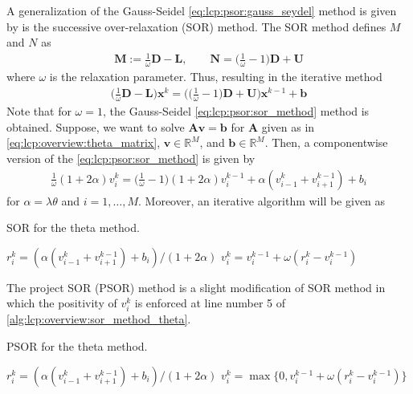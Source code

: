 A generalization of the Gauss-Seidel \eqref{eq:lcp:psor:gauss_seydel} method is given by is the successive over-relaxation (SOR) method. The SOR method defines $M$ and $N$ as 
\begin{align*}
  \mathbf{M} := \frac{1}{\omega}\mathbf{D} - \mathbf{L}, \qquad \mathbf{N}=\bigg(\frac{1}{\omega} -1\bigg)\mathbf{D} + \mathbf{U}
\end{align*}
where $\omega$ is the relaxation parameter. Thus, resulting in the iterative method
\begin{align}
  \label{eq:lcp:psor:sor_method}
  \bigg(\frac{1}{\omega}\mathbf{D} - \mathbf{L}\bigg)\mathbf{x}^{k} = \bigg(\bigg(\frac{1}{\omega}-1\bigg)\mathbf{D} + \mathbf{U}\bigg)\mathbf{x}^{k-1} + \mathbf{b}
\end{align}
Note that for $\omega=1$, the Gauss-Seidel \eqref{eq:lcp:psor:sor_method} method is obtained. Suppose, we want to solve $\mathbf{A}\mathbf{v}=\mathbf{b}$ for $\mathbf{A}$ given as in \eqref{eq:lcp:overview:theta_matrix}, $\mathbf{v}\in\mathbb{R}^{M}$, and $\mathbf{b}\in\mathbb{R}^{M}$. Then, a componentwise version of the \eqref{eq:lcp:psor:sor_method} is given by 
\begin{align}
  \label{eq:lcp:psor:sor_method_cwise}
  \frac{1}{\omega}(1+2\alpha)v^{k}_i = \bigg(\frac{1}{\omega}-1\bigg)(1+2\alpha)v^{k-1}_{i} + \alpha (v^{k}_{i-1} + v^{k-1}_{i+1}) + b_i
\end{align}
for $\alpha=\lambda\theta$ and $i=1,\dots,M$. Moreover, an iterative algorithm will be given as
\begin{algorithm}[H]
  \caption{SOR for the theta method.}\label{alg:lcp:overview:sor_method_theta}
  \begin{algorithmic}[1]
  \State $r^{k}_{i} = (\alpha(v^{k}_{i-1} + v^{k-1}_{i+1}) + b_i)/(1+2\alpha)$ 
  \State $v^{k}_{i} = v^{k-1}_i + \omega(r^{k}_{i} - v^{k-1}_i)$
  \EndFor
  \EndFor
\end{algorithmic}
\end{algorithm}
The project SOR (PSOR) method is a slight modification of SOR method in which the positivity of $v^{k}_i$ is enforced at line number 5 of \eqref{alg:lcp:overview:sor_method_theta}.
\begin{algorithm}[H]
  \caption{PSOR for the theta method.}\label{alg:lcp:overview:psor_method_theta}
  \begin{algorithmic}[1]
  \State $r^{k}_{i} = (\alpha(v^{k}_{i-1} + v^{k-1}_{i+1}) + b_i)/(1+2\alpha)$ 
  \State $v^{k}_{i} = \max\big\{0, v^{k-1}_i + \omega(r^{k}_{i} - v^{k-1}_i)\big\}$
  \EndFor
  \EndFor
\end{algorithmic}
\end{algorithm}
